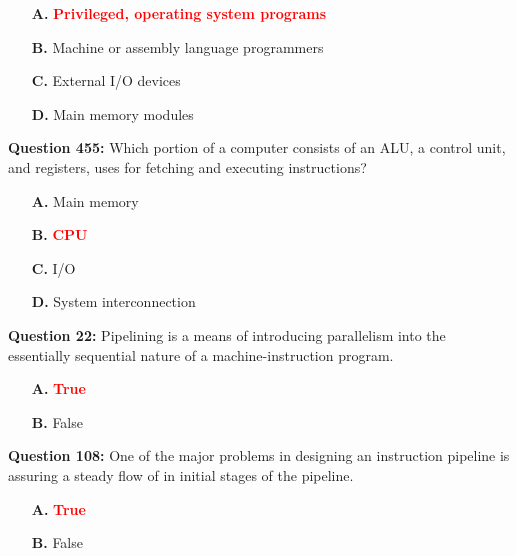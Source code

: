 \documentclass[12pt,a4paper]{article}
\begin{document}
\begin{itemize}
    \item[\textbf{A.}] \textcolor{red}{\textbf{Privileged, operating system programs}}
    \item[\textbf{B.}] Machine or assembly language programmers
    \item[\textbf{C.}] External I/O devices
    \item[\textbf{D.}] Main memory modules
\end{itemize}

\vspace{0.5cm}

\vspace{0.5cm}

\textbf{Question 455:} Which portion of a computer consists of an ALU, a control unit, and registers, uses for fetching and executing instructions?

\begin{itemize}
    \item[\textbf{A.}] Main memory
    \item[\textbf{B.}] \textcolor{red}{\textbf{CPU}}
    \item[\textbf{C.}] I/O
    \item[\textbf{D.}] System interconnection
\end{itemize}

\vspace{0.5cm}

\vspace{0.5cm}

\textbf{Question 22:} Pipelining is a means of introducing parallelism into the essentially sequential nature of a machine-instruction program.

\begin{itemize}
    \item[\textbf{A.}] \textcolor{red}{\textbf{True}}
    \item[\textbf{B.}] False
\end{itemize}

\vspace{0.5cm}

\vspace{0.5cm}

\textbf{Question 108:} One of the major problems in designing an instruction pipeline is assuring a steady flow of in initial stages of the pipeline.

\begin{itemize}
    \item[\textbf{A.}] \textcolor{red}{\textbf{True}}
    \item[\textbf{B.}] False
\end{itemize}
\end{document}
